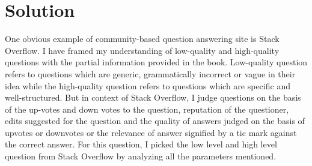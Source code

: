 \documentclass[12pt]{report}
\begin{document}
\section{Solution}
One obvious example of community-based question answering site is Stack Overflow. I have framed my understanding of low-quality and high-quality questions with the partial information provided in the book. Low-quality question refers to questions which are generic, grammatically incorrect or vague in their idea while the high-quality question refers to questions which are specific and well-structured.  But in context of Stack Overflow, I judge questions on the basis of the up-votes and down votes to the question, reputation of the questioner, edits suggested for the question and the quality of answers judged on the basis of upvotes or downvotes or the relevance of answer signified by a tic mark against the correct answer. For this question, I picked the low level and high level question from Stack Overflow by analyzing all the parameters mentioned.
\end{document}
